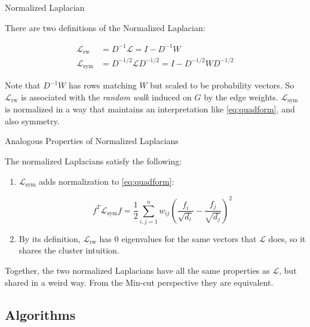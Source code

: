 \documentclass{article}
\begin{document}
\begin{dfn}{Normalized Laplacian}

There are two definitions of the Normalized Laplacian:

\begin{align}
    \mathcal{L}_{\text{rw}} & = D^{-1} \mathcal{L} = I - D^{-1}W \\
    \mathcal{L}_{\text{sym}} & = D^{-1/2} \mathcal{L} D^{-1/2} = I - D^{-1/2} W D^{-1/2}
\end{align} 
\end{dfn}
\begin{rem}
Note that $D^{-1}W$ has rows matching $W$ but scaled to be probability vectors. So $\mathcal{L}_{\text{rw}}$ is associated with the \textit{random walk} induced on $G$ by the edge weights. $\mathcal{L}_{\text{sym}}$ is normalized in a way that maintains an interpretation like \eqref{eq:quadform}, and also symmetry.
\end{rem}

\begin{theorem}{Analogous Properties of Normalized Laplacians}

\noindent The normalized Laplacians satisfy the following:

\begin{enumerate}
    \item $\mathcal{L}_{\text{sym}}$ adds normalization to \eqref{eq:quadform}:
    
    \begin{equation}
        f^T \mathcal{L}_{\text{sym}} f = \frac{1}{2} \sum_{i, j = 1}^n w_{ij} \left(\frac{f_i}{\sqrt{d_i}} - \frac{f_j}{\sqrt{d_j}} \right)^2
    \end{equation}
    
    \item By its definition, $\mathcal{L}_{\text{rw}}$ has $0$ eigenvalues for the same vectors that $\mathcal{L}$ does, so it shares the cluster intuition.
    \end{enumerate}
\end{theorem}
\begin{rem}
Together, the two normalized Laplacians have all the same properties as $\mathcal{L}$, but shared in a weird way. From the Min-cut perspective they are equivalent.
\end{rem}

\subsection{Algorithms}
\end{document}
